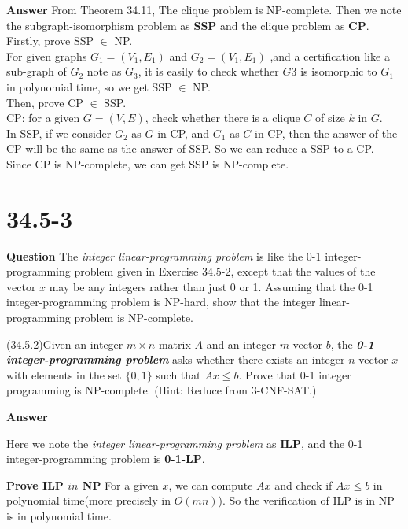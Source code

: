 \documentclass[12pt]{article}
\begin{document}
\textbf{Answer}
From Theorem 34.11, The clique problem is NP-complete. Then we note the subgraph-isomorphism problem as \textbf{SSP} and the clique problem as \textbf{CP}.\\

Firstly, prove SSP $\in$ NP.\\
For given graphs $G_1 = (V_1, E_1)$ and $G_2 = (V_1, E_1)$ ,and a certification like a sub-graph of $G_2$ note as $G_3$, it is easily to check whether $G3$ is isomorphic to $G_1$ in polynomial time, so we get SSP $\in$ NP.\\

Then, prove CP $\in$ SSP.\\
CP: for a given $G = (V, E)$, check whether there is a clique $C$ of size $k$ in $G$.\\
In SSP, if we consider $G_2$ as $G$ in CP, and $G_1$ as $C$ in CP, then the answer of the CP will be the same as the answer of SSP. So we can reduce a SSP to a CP.\\

Since CP is NP-complete, we can get SSP is NP-complete.



\section{34.5-3}
\textbf{Question}
The \textit{integer linear-programming problem} is like the 0-1 integer-programming problem given in Exercise 34.5-2, except that the values of the vector $x$ may be any integers rather than just 0 or 1. Assuming that the 0-1 integer-programming problem is NP-hard, show that the integer linear-programming problem is NP-complete.

(34.5.2)Given an integer $m \times n$ matrix $A$ and an integer $m$-vector $b$, the \textbf{\textit{0-1 integer-programming problem}} asks whether there exists an integer $n$-vector $x$ with elements in the set $\{0, 1\}$ such that $Ax \le b$. Prove that 0-1 integer programming is NP-complete. (Hint: Reduce from 3-CNF-SAT.)

\textbf{Answer}

Here we note the \textit{integer linear-programming problem} as \textbf{ILP}, and the 0-1 integer-programming problem is \textbf{0-1-LP}.



\textbf{Prove ILP $in$ NP}
For a given $x$, we can compute $Ax$ and check if $Ax \leq b$ in polynomial time(more precisely in $O(mn)$). So the verification of ILP is in NP is in polynomial time.
\end{document}
